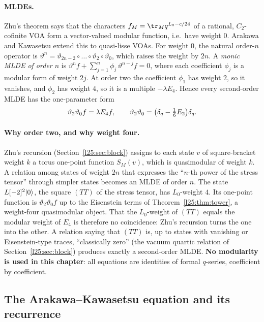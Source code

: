 \paragraph{MLDEs.} Zhu's theorem says that the characters $f_M=\tr_Mq^{L_0-c/24}$ of a rational, $C_2$-cofinite VOA
form a vector-valued modular function, i.e.\ have weight $0$. Arakawa and Kawasetsu extend this to quasi-lisse VOAs.
For weight $0$, the natural order-$n$ operator is
$\vartheta^n=\vartheta_{2n-2}\circ\dots\circ\vartheta_2\circ\vartheta_0$, which raises the weight by $2n$. A
\emph{monic MLDE of order $n$} is
$\vartheta^nf+\sum_{j=1}^{n}\phi_j\,\vartheta^{n-j}f=0$, where each coefficient $\phi_j$ is a modular form of weight
$2j$. At order two the coefficient $\phi_1$ has weight $2$, so it vanishes, and $\phi_2$ has weight $4$, so it is a
multiple $-\lambda E_4$. Hence every second-order MLDE has the one-parameter form
\begin{equation*}
\vartheta_2\vartheta_0f=\lambda E_4f,\qquad \vartheta_2\vartheta_0=\big(\delta_q-\tfrac16E_2\big)\delta_q .
\end{equation*}

\paragraph{Why order two, and why weight four.} Zhu's recursion (Section~\ref{l25:sec:block}) assigns to each state
$v$ of square-bracket weight $k$ a torus one-point function $S_M(v)$, which is quasimodular of weight $k$. A relation
among states of weight $2n$ that expresses the ``$n$-th power of the stress tensor'' through simpler states becomes an
MLDE of order $n$. The state $L[-2]^2|0\rangle$, the square $(TT)$ of the stress tensor, has $L_0$-weight $4$.
Its one-point function is $\vartheta_2\vartheta_0f$ up to the Eisenstein terms of Theorem~\ref{l25:thm:tower}, a
weight-four quasimodular object. That the $L_0$-weight of $(TT)$ equals the modular weight of $E_4$ is therefore no
coincidence: Zhu's recursion turns the one into the other. A relation saying that $(TT)$ is, up to states with
vanishing or Eisenstein-type traces, ``classically zero'' (the vacuum quartic relation of
Section~\ref{l25:sec:block}) produces exactly a second-order MLDE. \textbf{No modularity is used in this chapter}: all
equations are identities of formal $q$-series, coefficient by coefficient.

\subsection{The Arakawa--Kawasetsu equation and its recurrence}

